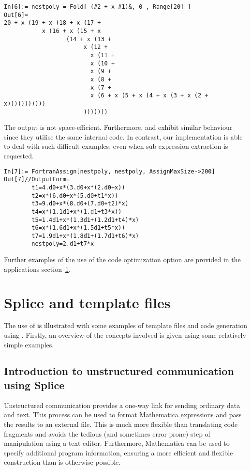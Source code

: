 \documentclass [12pt,twoside]{article}
\begin{document}
\begin{verbatim}
In[6]:= nestpoly = Fold[ (#2 + x #1)&, 0 , Range[20] ]
Out[6]=
20 + x (19 + x (18 + x (17 +
           x (16 + x (15 + x
                  (14 + x (13 +
                       x (12 +
                         x (11 +
                         x (10 +
                         x (9 +
                         x (8 +
                         x (7 +
                         x (6 + x (5 + x (4 + x (3 + x (2 + x)))))))))))
                       )))))))
\end{verbatim}
The output is not space-efficient. Furthermore,  and 
exhibit similar behaviour since they utilise the same internal code. In contrast,
our implementation is able to deal with such difficult examples, even when
sub-expression extraction is requested.
\begin{verbatim}
In[7]:= FortranAssign[nestpoly, nestpoly, AssignMaxSize->200]
Out[7]//OutputForm=
        t1=4.d0+x*(3.d0+x*(2.d0+x))
        t2=x*(6.d0+x*(5.d0+t1*x))
        t3=9.d0+x*(8.d0+(7.d0+t2)*x)
        t4=x*(1.1d1+x*(1.d1+t3*x))
        t5=1.4d1+x*(1.3d1+(1.2d1+t4)*x)
        t6=x*(1.6d1+x*(1.5d1+t5*x))
        t7=1.9d1+x*(1.8d1+(1.7d1+t6)*x)
        nestpoly=2.d1+t7*x
\end{verbatim}
Further examples of the use of the code optimization option are provided in the
applications section~\ref{spl_exmps}.

\pagebreak[2]

\section{Splice and template files}\label{spl_exmps}

The use of  is illustrated with some examples of template
files and code generation using . Firstly, an overview of the
concepts involved is given using some relatively simple examples.

\subsection{Introduction to unstructured communication using Splice}

Unstructured communication provides a one-way link for sending ordinary data and
text. This process can be used to format Mathematica expressions and pass the
results to an external file. This is much more flexible than translating code
fragments and avoids the tedious (and sometimes error prone) step of manipulation
using a text editor. Furthermore, Mathematica can be used to specify additional
program information, ensuring a more efficient and flexible construction than is
otherwise possible.
\end{document}
